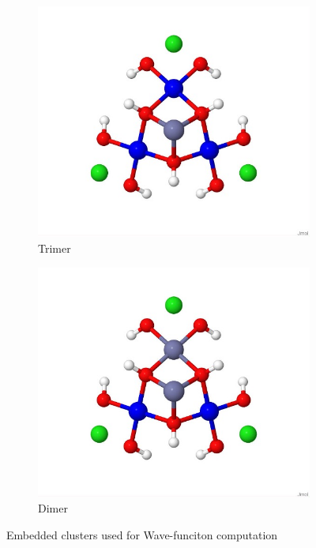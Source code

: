 \documentclass[12pt]{report}
\numberwithin{equation}{section}
\begin{document}
\begin{figure}
    \centering
    \begin{subfigure}{.5\textwidth}
      \centering
      \includegraphics[width=\linewidth]{Images/Trimere.jpg}
      \caption{Trimer}
      \label{fig:subtrimer}
    \end{subfigure}%
    \begin{subfigure}{.5\textwidth}
      \centering
      \includegraphics[width=\linewidth]{Images/Dimer.jpg}
      \caption{Dimer}
      \label{fig:subdimer}
    \end{subfigure}
    \caption{Embedded clusters used for Wave-funciton computation}
    \label{fig:FragmentWF}
    \end{figure}
\end{document}
